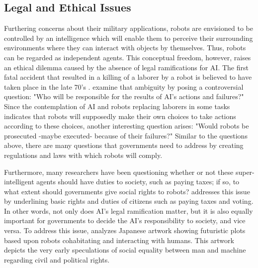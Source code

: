 \documentclass[man]{apa6}
\begin{document}
 \subsection{Legal and Ethical Issues}
Furthering concerns about their military applications, robots are envisioned to be controlled by an intelligence which will enable them to perceive their surrounding environments where they can interact with objects by themselves.
Thus, robots can be regarded as independent agents.
This conceptual freedom, however, raises an ethical dilemma caused by the absence of legal ramifications for AI.
The first fatal accident that resulted in a killing of a laborer by a robot is believed to have taken place in the late 70's \cite{lin}.
 examine that ambiguity by posing a controversial question: "Who will be responsible for the results of AI's actions and failures?"
Since the contemplation of AI and robots replacing laborers in some tasks indicates that robots will supposedly make their own choices to take actions according to these choices, another interesting question arises: "Would robots be prosecuted -maybe executed- because of their failures?"
Similar to the questions above, there are many questions that governments need to address by creating regulations and laws with which robots will comply. \par
Furthermore, many researchers have been questioning whether or not these super-intelligent agents should have duties to society, such as paying taxes; if so, to what extent should governments  give social rights to robots?
 addresses this issue by underlining basic rights and duties of citizens such as paying taxes and voting.
In other words, not only does AI's legal ramification matter, but it is also equally important for governments to decide the AI's responsibility to society, and vice versa.
To address this issue,  analyzes Japanese artwork showing futuristic plots based upon robots cohabitating and interacting with humans.
This artwork depicts the very early speculations of social equality between man and machine regarding civil and political rights.
\end{document}
